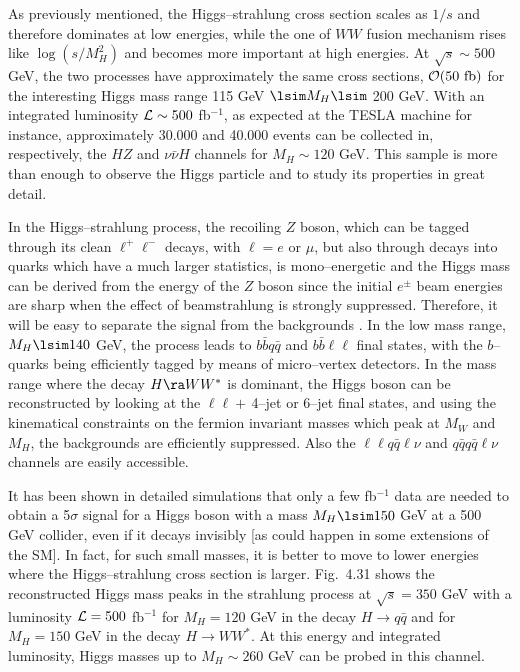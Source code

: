 {As previously mentioned, the Higgs--strahlung cross section scales as $1/s$ and
therefore dominates at low energies, while the one of $WW$ fusion mechanism
rises like $\log(s/M_H^2)$ and becomes more important at high energies. At
$\sqrt{s} \sim 500$ GeV, the two processes have approximately the same cross
sections, ${\cal O} (50~{\rm fb})$ for the interesting Higgs mass range 115 GeV
$\lsim M_H \lsim$ 200 GeV.  With an integrated luminosity ${\cal L} \sim 500$
fb$^{-1}$, as expected at the TESLA machine for instance, approximately 30.000
and 40.000 events can be collected in, respectively, the $HZ$ and $\nu \bar \nu
H$ channels for $M_H \sim 120$ GeV.  This sample is more than enough to observe
the Higgs particle and to study its properties in great detail.  \s

In the Higgs--strahlung process, the recoiling $Z$ boson, which can be tagged
through its clean $\ell^+ \ell^-$ decays, with $\ell=e$ or $\mu$, but also
through decays into quarks which have a much larger statistics, is
mono--energetic and the Higgs mass can be derived from the energy of the $Z$
boson since the initial $e^\pm$ beam energies are sharp when the effect of
beamstrahlung is strongly suppressed.  Therefore, it will be easy to separate
the signal from the backgrounds \cite{ee-HZ-backg,ee-HZ-backg1}. In the low
mass range, $M_H \lsim 140$ GeV, the process leads to $b\bar{b}q\bar{q}$ and
$b\bar{b}\ell \ell$ final states, with the $b$--quarks being efficiently tagged
by means of micro--vertex detectors. In the mass range where the decay $H \ra
WW^*$ is dominant, the Higgs boson can be reconstructed by looking at the $\ell
\ell + \,$4--jet or 6--jet final states, and using the kinematical constraints
on the fermion invariant masses which peak at $M_W$ and $M_H$, the backgrounds
are efficiently suppressed. Also the $\ell \ell q\bar q  \ell \nu$ and 
$q\bar q q\bar q  \ell \nu$ channels are easily accessible. \s

It has been shown in detailed simulations \cite{TESLA} that only a few
fb$^{-1}$ data are needed to obtain a 5$\sigma$ signal for a Higgs boson with a
mass $M_H \lsim 150$ GeV at a 500 GeV collider, even if it decays invisibly [as
could happen in some extensions of the SM].  In fact, for such small masses, it
is better to move to lower energies where the Higgs--strahlung cross section is
larger. Fig.~4.31 shows the reconstructed Higgs mass peaks in the strahlung
process at $\sqrt{s}=350$ GeV with a luminosity ${\cal L}=500$ fb$^{-1}$ for
$M_H=120$ GeV in the decay $H \to q\bar{q}$ and for $M_H=150$ GeV in the decay
$H \to WW^*$. At this energy and integrated luminosity, Higgs masses up to $M_H
\sim 260$ GeV can be probed in this channel.\s

}
